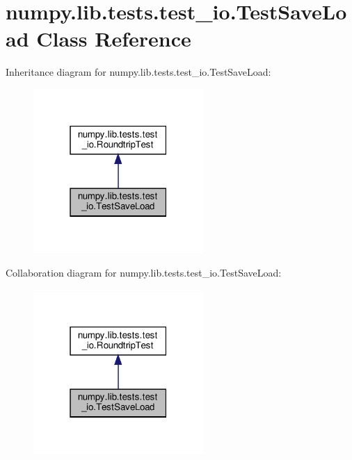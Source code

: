 \hypertarget{classnumpy_1_1lib_1_1tests_1_1test__io_1_1TestSaveLoad}{}\section{numpy.\+lib.\+tests.\+test\+\_\+io.\+Test\+Save\+Load Class Reference}
\label{classnumpy_1_1lib_1_1tests_1_1test__io_1_1TestSaveLoad}


Inheritance diagram for numpy.\+lib.\+tests.\+test\+\_\+io.\+Test\+Save\+Load\+:
\nopagebreak
\begin{figure}[H]
\begin{center}
\leavevmode
\includegraphics[width=183pt]{classnumpy_1_1lib_1_1tests_1_1test__io_1_1TestSaveLoad__inherit__graph}
\end{center}
\end{figure}


Collaboration diagram for numpy.\+lib.\+tests.\+test\+\_\+io.\+Test\+Save\+Load\+:
\nopagebreak
\begin{figure}[H]
\begin{center}
\leavevmode
\includegraphics[width=183pt]{classnumpy_1_1lib_1_1tests_1_1test__io_1_1TestSaveLoad__coll__graph}
\end{center}
\end{figure}
